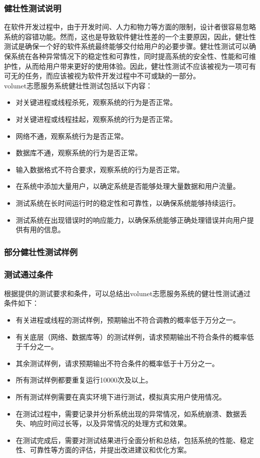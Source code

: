 \subsubsection{健壮性测试说明}
在软件开发过程中，由于开发时间、人力和物力等方面的限制，设计者很容易忽略系统的容错功能。然而，这也是导致软件健壮性差的一个主要原因，因此，健壮性测试是确保一个好的软件系统最终能够交付给用户的必要步骤。健壮性测试可以确保系统在各种异常情况下的稳定性和可靠性，同时提高系统的安全性、性能和可维护性，从而给用户带来更好的使用体验。因此，健壮性测试不应该被视为一项可有可无的任务，而应该被视为软件开发过程中不可或缺的一部分。\\
volunet志愿服务系统健壮性测试包括以下内容：
\begin{itemize}[itemsep=2pt,topsep=0pt,parsep=4pt,itemindent=1em]
\item 对关键进程或线程杀死，观察系统的行为是否正常。
\item 对关键进程或线程挂起，观察系统的行为是否正常。
\item 网络不通，观察系统行为是否正常。
\item 数据库不通，观察系统的行为是否正常。
\item 输入数据格式不符合要求，观察系统的行为是否正常。
\item 在系统中添加大量用户，以确定系统是否能够处理大量数据和用户流量。
\item 测试系统在长时间运行时的稳定性和可靠性，以确保系统能够持续运行。
\item 测试系统在出现错误时的响应能力，以确保系统能够正确处理错误并向用户提供有用的信息。
\end{itemize}
\subsubsection{部分健壮性测试样例}

\subsubsection{测试通过条件}

根据提供的测试要求和条件，可以总结出volunet志愿服务系统的健壮性测试通过条件如下：
\begin{itemize}[itemsep=2pt,topsep=0pt,parsep=4pt,itemindent=1em]
\item 有关进程或线程的测试样例，预期输出不符合调教的概率低于万分之一。
\item 有关底层（网络、数据库等）的测试样例，请求预期输出不符合条件的概率低于千分之一。
\item 其余测试样例，请求预期输出不符合条件的概率低于十万分之一。
\item 所有测试样例都要重复运行10000次及以上。
\item 所有测试样例需要在真实环境下进行测试，模拟真实用户使用情况。
\item 在测试过程中，需要记录并分析系统出现的异常情况，如系统崩溃、数据丢失、响应时间过长等，以及异常情况的处理方式和效果。
\item 在测试完成后，需要对测试结果进行全面分析和总结，包括系统的性能、稳定性、可靠性等方面的评估，并提出改进建议和优化方案。
\end{itemize}
